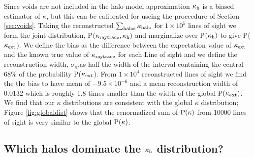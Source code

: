 \documentclass[useAMS,usenatbib]{mn2e}
\begin{document}
Since voids are not included in the halo model approximation $\kappa_{\rm h}$ is a biased estimator of $\kappa$, but this can be calibrated for useing the proceedure of Section \ref{sec:voids}. Taking the reconstructed $\sum_{\rm halos} \kappa_{\rm halo}$ for $1\times 10^{5}$ lines of sight we form the joint distribution, P$(\kappa_{\rm raytrace},\kappa_{\rm h})$ and marginalize over P$(\kappa_{\rm h})$ to give P($\kappa_{\rm ext}$). We define the bias as the difference between the expectation value of $\kappa_{\rm ext}$ and the known true value of $\kappa_{\rm raytrace}$ for each Line of sight and we define the reconstruction width, $\sigma_{\kappa}$,as half the width of the interval containing the central $68\%$ of the probability P($\kappa_{\rm ext}$). From $1\times 10^{4}$ reconstructed lines of sight we find the the bias to have mean of $-9.5\times 10^{-6}$ and a mean reconstruction width of 0.0132 which is roughly 1.8 times smaller than the width of the global P$(\kappa_{\rm ext})$. We find that our $\kappa$ distributions are consistent with the global $\kappa$ distribution; Figure \ref{fig:globaldist} shows that the renormalized sum of ${\rm P}(\kappa)$ from 10000 lines of sight is very similar to the global ${\rm P}(\kappa)$.

\subsection{Which halos dominate the $\kappa_{\rm h}$ distribution?}
\end{document}
